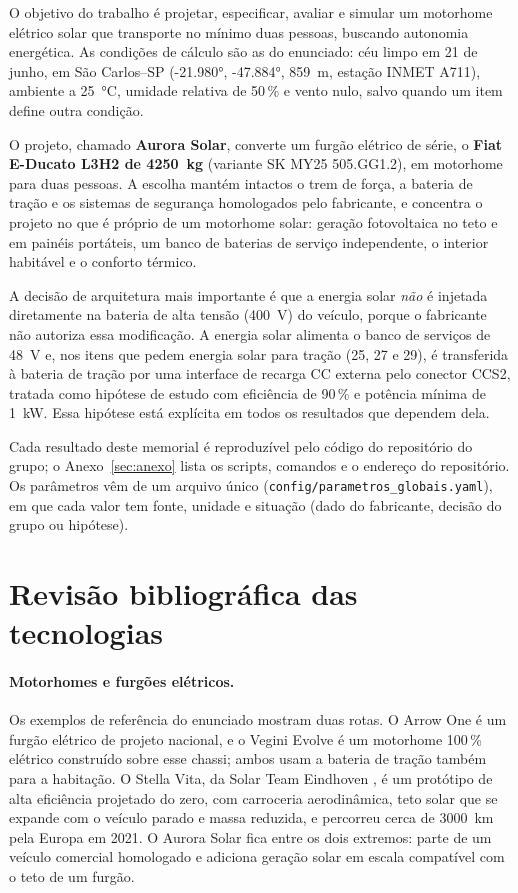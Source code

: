 \documentclass[11pt,a4paper]{article}
\newcommand{\cod}[1]{\texttt{\small #1}}
\begin{document}
O objetivo do trabalho é projetar, especificar, avaliar e simular um motorhome elétrico
solar que transporte no mínimo duas pessoas, buscando autonomia energética. As condições
de cálculo são as do enunciado: céu limpo em 21 de junho, em São Carlos--SP
(\ang{-21.980}, \ang{-47.884}, \SI{859}{m}, estação INMET A711), ambiente a \SI{25}{\celsius},
umidade relativa de 50\,\% e vento nulo, salvo quando um item define outra condição.

O projeto, chamado \textbf{Aurora Solar}, converte um furgão elétrico de série, o
\textbf{Fiat E-Ducato L3H2 de \SI{4250}{kg}} (variante SK MY25 505.GG1.2), em motorhome para duas
pessoas. A escolha mantém intactos o trem de força, a bateria de tração e os sistemas de
segurança homologados pelo fabricante, e concentra o projeto no que é próprio de um
motorhome solar: geração fotovoltaica no teto e em painéis portáteis, um banco de
baterias de serviço independente, o interior habitável e o conforto térmico.

A decisão de arquitetura mais importante é que a energia solar \emph{não} é injetada
diretamente na bateria de alta tensão (\SI{400}{V}) do veículo, porque o fabricante não
autoriza essa modificação. A energia solar alimenta o banco de serviços de \SI{48}{V} e,
nos itens que pedem energia solar para tração (25, 27 e 29), é transferida à bateria de
tração por uma interface de recarga CC externa pelo conector CCS2, tratada como hipótese de
estudo com eficiência de 90\,\% e potência mínima de \SI{1}{kW}. Essa hipótese está
explícita em todos os resultados que dependem dela.

Cada resultado deste memorial é reproduzível pelo código do repositório do grupo; o
Anexo~\ref{sec:anexo} lista os scripts, comandos e o endereço do repositório. Os
parâmetros vêm de um arquivo único (\cod{config/parametros\_globais.yaml}), em que cada valor
tem fonte, unidade e situação (dado do fabricante, decisão do grupo ou hipótese).

\section{Revisão bibliográfica das tecnologias}

\paragraph{Motorhomes e furgões elétricos.} Os exemplos de referência do enunciado
mostram duas rotas. O Arrow One \cite{arrow} é um furgão elétrico de projeto nacional, e o
Vegini Evolve \cite{vegini} é um motorhome 100\,\% elétrico construído sobre esse
chassi; ambos usam a bateria de tração também para a habitação. O Stella Vita, da Solar
Team Eindhoven \cite{stellavita}, é um protótipo de alta eficiência projetado do zero, com
carroceria aerodinâmica, teto solar que se expande com o veículo parado e massa reduzida, e
percorreu cerca de \SI{3000}{km} pela Europa em 2021. O Aurora Solar fica entre os dois
extremos: parte de um veículo comercial homologado e adiciona geração solar em escala
compatível com o teto de um furgão.
\end{document}
